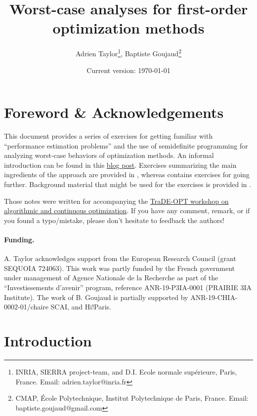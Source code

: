 \documentclass[11pt,a4paper]{article}
\begin{document}
	\author{Adrien Taylor\footnote{INRIA, SIERRA project-team, and D.I. Ecole normale sup\'erieure, Paris, France. Email: adrien.taylor@inria.fr}, Baptiste Goujaud\footnote{CMAP, École Polytechnique, Institut Polytechnique de Paris, France. Email: baptiste.goujaud@gmail.com}}
	
	\title{Worst-case analyses for first-order optimization methods}
	\date{Current version: \today}
	\maketitle
	
	\renewcommand*\contentsname{}
	\setcounter{tocdepth}{2} \tableofcontents
	


	\section*{Foreword \& Acknowledgements}
	This document provides a series of exercises for getting familiar with ``performance estimation problems'' and the use of semidefinite programming for analyzing worst-case behaviors of optimization methods. An informal introduction can be found in this \href{https://francisbach.com/computer-aided-analyses/}{blog post}. Exercises summarizing the main ingredients of the approach are provided in , whereas  contains exercises for going further. Background material that might be used for the exercises is provided in .
	
	Those notes were written for accompanying the \href{https://trade-opt-itn.eu/workshop.html}{TraDE-OPT workshop on algorithmic and continuous optimization}. If you have any comment, remark, or if you found a typo/mistake, please don't hesitate to feedback the authors!
	
	\paragraph*{Funding.} A. Taylor acknowledges support from the European Research Council (grant SEQUOIA 724063). This work was partly funded by the French government under management of Agence Nationale de la Recherche as part of the ``Investissements d’avenir'' program, reference ANR-19-P3IA-0001 (PRAIRIE 3IA Institute). The work of B. Goujaud is partially supported by ANR-19-CHIA-0002-01/chaire SCAI, and Hi!Paris. 
	
	\clearpage
	\section{Introduction}			%
	
\end{document}
